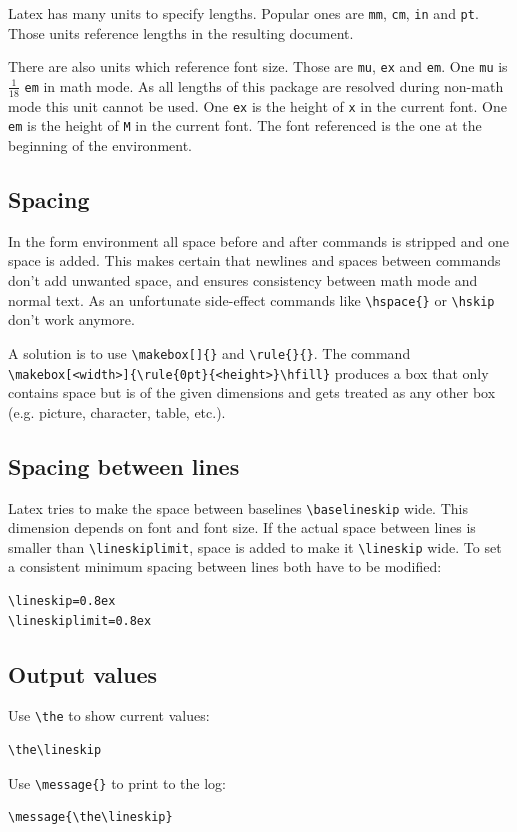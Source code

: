 \documentclass[parskip=half-]{scrartcl}
\begin{document}
Latex has many units to specify lengths. Popular ones are \texttt{mm}, \texttt{cm}, \texttt{in} and \texttt{pt}. Those units reference lengths in the resulting document.

There are also units which reference font size. Those are \texttt{mu}, \texttt{ex} and \texttt{em}. One \texttt{mu} is $\frac{1}{18}$ \texttt{em} in math mode. As all lengths of this package are resolved during non-math mode this unit cannot be used. One \texttt{ex} is the height of \texttt{x} in the current font. One \texttt{em} is the height of \texttt{M} in the current font. The font referenced is the one at the beginning of the environment.

\subsection{Spacing}

In the form environment all space before and after commands is stripped and one space is added. This makes certain that newlines and spaces between commands don't add unwanted space, and ensures consistency between math mode and normal text. As an unfortunate side-effect commands like \verb|\hspace{}| or \verb|\hskip| don't work anymore.

A solution is to use \verb|\makebox[]{}| and \verb|\rule{}{}|. The command \hfil\break\verb|\makebox[<width>]{\rule{0pt}{<height>}\hfill}| produces a box that only contains space but is of the given dimensions and gets treated as any other box (e.g. picture, character, table, etc.).

\subsection{Spacing between lines}

Latex tries to make the space between baselines \verb|\baselineskip| wide. This dimension depends on font and font size. If the actual space between lines is smaller than \verb|\lineskiplimit|, space is added to make it \verb|\lineskip| wide. To set a consistent minimum spacing between lines both have to be modified:
\begin{verbatim}
\lineskip=0.8ex
\lineskiplimit=0.8ex
\end{verbatim}

\subsection{Output values}

Use \verb|\the| to show current values:
\begin{verbatim}
\the\lineskip
\end{verbatim}

Use \verb|\message{}| to print to the log:
\begin{verbatim}
\message{\the\lineskip}
\end{verbatim}
\end{document}
